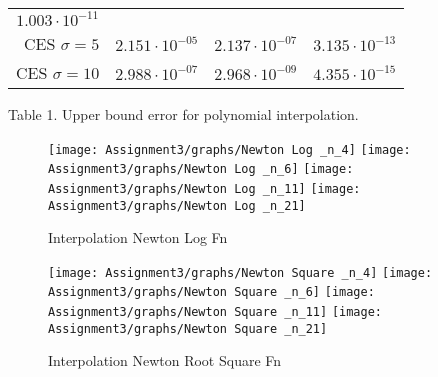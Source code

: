 \documentclass[]{article}
\begin{document}
\begin{longtable}[]{@{}rrrr@{}}
\begin{minipage}[t]{0.26\columnwidth}
\(1.003 \cdot 10^{-11}\)\strut
\end{minipage}\tabularnewline
\begin{minipage}[t]{0.10\columnwidth}\raggedleft
CES \(\sigma=5\)\strut
\end{minipage} & \begin{minipage}[t]{0.26\columnwidth}\raggedleft
\(2.151 \cdot 10^{-05}\)\strut
\end{minipage} & \begin{minipage}[t]{0.26\columnwidth}\raggedleft
\(2.137 \cdot 10^{-07}\)\strut
\end{minipage} & \begin{minipage}[t]{0.26\columnwidth}\raggedleft
\(3.135 \cdot 10^{-13}\)\strut
\end{minipage}\tabularnewline
\begin{minipage}[t]{0.10\columnwidth}\raggedleft
CES \(\sigma=10\)\strut
\end{minipage} & \begin{minipage}[t]{0.26\columnwidth}\raggedleft
\(2.988 \cdot 10^{-07}\)\strut
\end{minipage} & \begin{minipage}[t]{0.26\columnwidth}\raggedleft
\(2.968 \cdot 10^{-09}\)\strut
\end{minipage} & \begin{minipage}[t]{0.26\columnwidth}\raggedleft
\(4.355 \cdot 10^{-15}\)\strut
\end{minipage}\tabularnewline
\bottomrule
\end{longtable}

Table 1. Upper bound error for polynomial interpolation.

\begin{figure}

{\centering \texttt{[image: Assignment3/graphs/Newton Log \_n\_4]} \texttt{[image: Assignment3/graphs/Newton Log \_n\_6]} \texttt{[image: Assignment3/graphs/Newton Log \_n\_11]} \texttt{[image: Assignment3/graphs/Newton Log \_n\_21]} 

}

\caption{Interpolation Newton Log Fn}\label{fig:unnamed-chunk-2}
\end{figure}

\begin{figure}

{\centering \texttt{[image: Assignment3/graphs/Newton Square \_n\_4]} \texttt{[image: Assignment3/graphs/Newton Square \_n\_6]} \texttt{[image: Assignment3/graphs/Newton Square \_n\_11]} \texttt{[image: Assignment3/graphs/Newton Square \_n\_21]} 

}

\caption{Interpolation Newton Root Square Fn}\label{fig:unnamed-chunk-3}
\end{figure}
\end{document}
